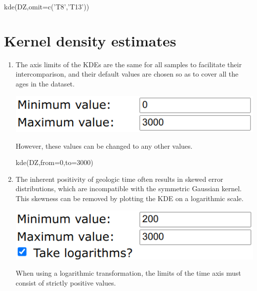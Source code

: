 \begin{refsection}
\begin{console}
kde(DZ,omit=c('T8','T13'))
\end{console}

\section{Kernel density estimates}

\begin{enumerate}
  
\item The axis limits of the KDEs are the same for all samples to
  facilitate their intercomparison, and their default values are
  chosen so as to cover all the ages in the dataset.

  \noindent\begin{minipage}[t]{.4\linewidth}
\strut\vspace*{-\baselineskip}\newline
\includegraphics[width=\linewidth]{../figures/detritalKDElimits.png}
\end{minipage}
\begin{minipage}[t]{.6\linewidth}
However, these values can be changed to any other values.
\end{minipage}

\begin{console}
kde(DZ,from=0,to=3000)
\end{console}

\item The inherent positivity of geologic time often results in skewed
  error distributions, which are incompatible with the symmetric
  Gaussian kernel. This skewness can be removed by plotting the KDE on
  a logarithmic scale.

  \noindent\begin{minipage}[t]{.4\linewidth}
\strut\vspace*{-\baselineskip}\newline
\includegraphics[width=\linewidth]{../figures/detritalKDElogscale.png}
\end{minipage}
\begin{minipage}[t]{.6\linewidth}
  When using a logarithmic transformation, the limits of the time axis
  must consist of strictly positive values.
\end{minipage}


\end{enumerate}
\end{refsection}

